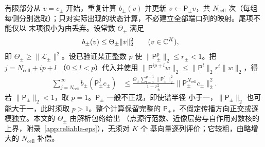 有限部分从 $v=c_\pm$ 开始，重复计算 $b_\pm(v)$ 并更新 $v\leftarrow\mathsf P_\pm v$，共
$N_{\mathrm{cell}}$ 次（每组每侧分别选取）；只对实际出现的状态计算，不必建立全部端口列的映射。尾项不能仅以
末项很小为由丢弃。设常数 $\Theta_\pm$ 满足
\begin{align}
  b_\pm(v)&\leq\Theta_\pm\lVert v\rVert_2^2\qquad(v\in\mathbb{C}^K),
  \label{eq:lead-operator-bound}
\end{align}
即 $\Theta_\pm\geq\lVert\mathcal L_\pm\rVert^2$。设已验证某正整数 $p$ 使
$\lVert\mathsf P_\pm^p\rVert_2\leq r_\pm<1$。把 $j=N_{\mathrm{cell}}+ip+l$
（$0\leq l<p$）代入并使用
$\lVert\mathsf P^{ip+l}w\rVert_2\leq\lVert\mathsf P^l\rVert_2r^i\lVert w\rVert_2$，得
\begin{align}
  \sum_{j=N_{\mathrm{cell}}}^{\infty}b_\pm(\mathsf P_\pm^jc_\pm)
  &\leq\frac{\Theta_\pm\sum_{l=0}^{p-1}\lVert\mathsf P_\pm^l\rVert_2^2}{1-r_\pm^2}
  \bigl\lVert\mathsf P_\pm^{N_{\mathrm{cell}}}c_\pm\bigr\rVert_2^2.
  \label{eq:boundary-propagation-tail}
\end{align}
若 $\lVert\mathsf P_\pm\rVert_2<1$，取 $p=1$。$\mathsf P_\pm$ 一般不正规，即使谱半径
小于一，$\lVert\mathsf P_\pm\rVert_2$ 也可能大于一，此时须取 $p>1$。整个计算保留完整的
$\mathsf P_\pm$，不假定传播方向正交或逐模独立。本文的 $\Theta_\pm$ 由解析包络给出
（点源行范数、近像层势与自作用对数核的上界，附录~\ref{app:reliable-eps}），无须对 $K$ 个
基向量逐列评价；它较粗，由略增大的 $N_{\mathrm{cell}}$ 补偿。


